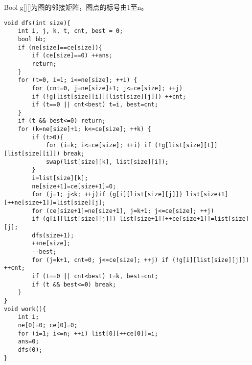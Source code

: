 Bool g[][]为图的邻接矩阵，图点的标号由1至n。
	\begin{lstlisting}
void dfs(int size){
	int i, j, k, t, cnt, best = 0;
	bool bb;
	if (ne[size]==ce[size]){
		if (ce[size]==0) ++ans;
		return;
	}
	for (t=0, i=1; i<=ne[size]; ++i) {
		for (cnt=0, j=ne[size]+1; j<=ce[size]; ++j)
		if (!g[list[size][i]][list[size][j]]) ++cnt;
		if (t==0 || cnt<best) t=i, best=cnt;
	}
	if (t && best<=0) return;
	for (k=ne[size]+1; k<=ce[size]; ++k) {
		if (t>0){
			for (i=k; i<=ce[size]; ++i) if (!g[list[size][t]][list[size][i]]) break;
			swap(list[size][k], list[size][i]);
		}
		i=list[size][k];
		ne[size+1]=ce[size+1]=0;
		for (j=1; j<k; ++j)if (g[i][list[size][j]]) list[size+1][++ne[size+1]]=list[size][j];
		for (ce[size+1]=ne[size+1], j=k+1; j<=ce[size]; ++j)
		if (g[i][list[size][j]]) list[size+1][++ce[size+1]]=list[size][j];
		dfs(size+1);
		++ne[size];
		--best;
		for (j=k+1, cnt=0; j<=ce[size]; ++j) if (!g[i][list[size][j]]) ++cnt;
		if (t==0 || cnt<best) t=k, best=cnt;
		if (t && best<=0) break;
	}
}
void work(){
	int i;
	ne[0]=0; ce[0]=0;
	for (i=1; i<=n; ++i) list[0][++ce[0]]=i;
	ans=0;
	dfs(0);
}
	\end{lstlisting}
